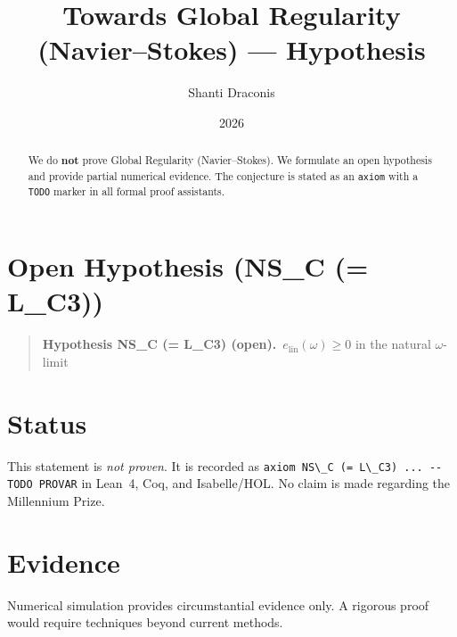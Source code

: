 \documentclass[11pt]{article}
\title{Towards Global Regularity (Navier--Stokes) — Hypothesis}
\author{Shanti Draconis}
\date{2026}
\begin{document}
\maketitle

\begin{abstract}
We do \textbf{not} prove Global Regularity (Navier--Stokes).
We formulate an open hypothesis and provide partial numerical evidence.
The conjecture is stated as an \texttt{axiom} with a \texttt{TODO}
marker in all formal proof assistants.
\end{abstract}

\section{Open Hypothesis (NS\_C (= L\_C3))}
\begin{quote}
  \textbf{Hypothesis NS\_C (= L\_C3) (open).}~$e_{\mathrm{lin}}(\omega) \geq 0$ in the natural $\omega$-limit
\end{quote}

\section{Status}
This statement is \emph{not proven}.  It is recorded as
\verb|axiom NS\_C (= L\_C3) ... -- TODO PROVAR| in Lean~4, Coq, and Isabelle/HOL.
No claim is made regarding the Millennium Prize.

\section{Evidence}
Numerical simulation provides circumstantial evidence only.
A rigorous proof would require techniques beyond current methods.
\end{document}
